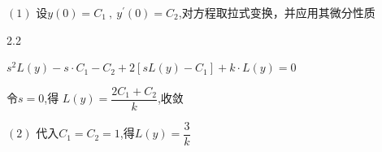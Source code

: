 \vspace{10pt}

 $(1)$ 设$y\left(0\right)=C_{1}\:,\:y^{\prime}\left(0\right)=C_{2}$,对方程取拉式变换，并应用其微分性质

\vspace{-10pt}

\begin{spacing}{2.2}
	\begin{center}
		$s^{2}L\left(y\right)-s\cdot C_{1}-C_{2}+2\left\lbrack sL\left(y\right)-C_{1}\right\rbrack+k\cdot L\left(y\right)=0$
		
		令$s=0$,得 $L\left(y\right)=\dfrac{2C_{1}+C_{2}}{k}$,收敛
	\end{center}
\end{spacing}

\vspace{-5pt}

\hspace{3em}$(2)$ 代入$C_{1}=C_{2}=1$,得$L\left(y\right)=\dfrac{3}{k}$

\clearpage